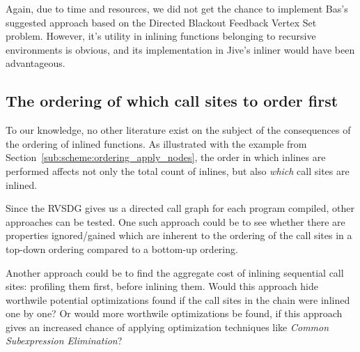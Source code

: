 Again, due to time and resources, we did not get the chance to implement Bas's
suggested approach based on the Directed Blackout Feedback Vertex Set problem.
However, it's utility in inlining functions belonging to recursive environments
is obvious, and its implementation in Jive's inliner would have been
advantageous.

\subsection{The ordering of which call sites to order first}
\label{sub:fw:call_site_visit_order}

To our knowledge, no other literature exist on the subject of the consequences
of the ordering of inlined functions. As illustrated with the example from
Section~\ref{sub:scheme:ordering_apply_nodes}, the order in which inlines are
performed affects not only the total count of inlines, but also \textit{which}
call sites are inlined.

Since the RVSDG gives us a directed call graph for each program compiled, other
approaches can be tested. One such approach could be to see whether there are
properties ignored/gained which are inherent to the ordering of the call sites
in a top-down ordering compared to a bottom-up ordering.

Another approach could be to find the aggregate cost of inlining sequential call
sites: profiling them first, before inlining them. Would this approach hide
worthwile potential optimizations found if the call sites in the chain were
inlined one by one? Or would more worthwile optimizations be found, if this
approach gives an increased chance of applying optimization techniques like
\textit{Common Subexpression Elimination}?

